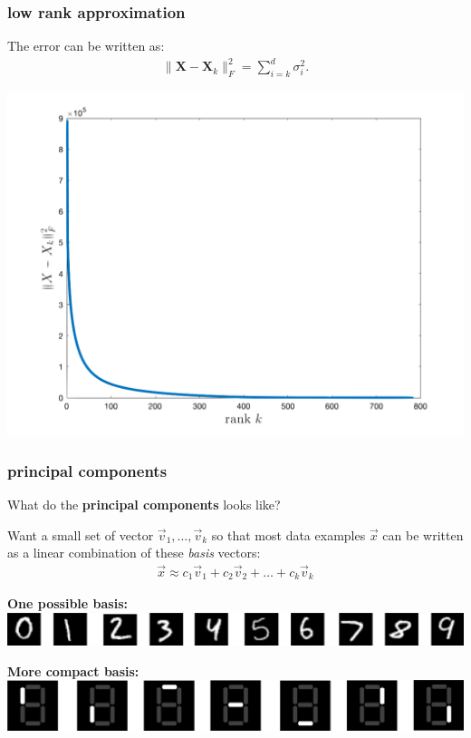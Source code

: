 \documentclass[handout,compress]{beamer}
\newcommand{\bv}[1]{\mathbf{#1}}
\begin{document}
\begin{frame}[t]
	\frametitle{low rank approximation}
	The error can be written as:
	\begin{align*}
	\|\bv{X} - \bv{X}_k\|_F^2 = \sum_{i=k}^d \sigma_i^2.
	\end{align*} 
	\begin{center}
		\includegraphics[width=.6\textwidth]{pca_errors.png}
	\end{center}
	
\end{frame}


\begin{frame}[t]
	\frametitle{principal components}
	What do the \textbf{principal components} looks like? 
	
	Want a small set of vector $\vec{v}_1, \ldots, \vec{v}_k$ so that most data examples $\vec{x}$ can be written as a linear combination of these \emph{basis} vectors:
	\begin{align*}
	\vec{x}\approx c_1 \vec{v}_1 + c_2 \vec{v}_2 + \ldots + c_k\vec{v}_k
	\end{align*}
	
	\textbf{One possible basis:} \includegraphics[width=.9\textwidth]{basis1.png}
	
	\textbf{More compact basis:} \includegraphics[width=.7\textwidth]{digital3.png}
	
\end{frame}
\end{document}
